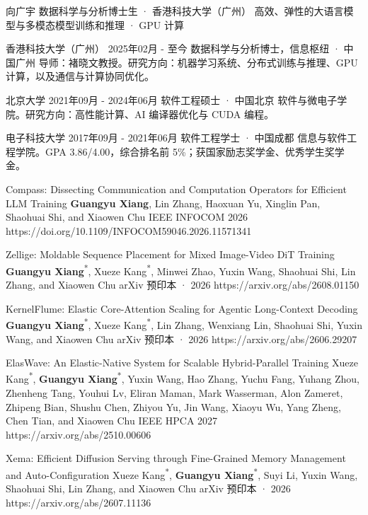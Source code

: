 \documentclass[10pt,a4paper]{article}
\begin{document}
\cvheader
  {向广宇}
  {数据科学与分析博士生 · 香港科技大学（广州）}
  {高效、弹性的大语言模型与多模态模型训练和推理 · GPU 计算}


\cventry
  {香港科技大学（广州）}
  {2025年02月 - 至今}
  {数据科学与分析博士，信息枢纽 · 中国广州}
  {导师：褚晓文教授。研究方向：机器学习系统、分布式训练与推理、GPU 计算，以及通信与计算协同优化。}

\cventry
  {北京大学}
  {2021年09月 - 2024年06月}
  {软件工程硕士 · 中国北京}
  {软件与微电子学院。研究方向：高性能计算、AI 编译器优化与 CUDA 编程。}

\cventry
  {电子科技大学}
  {2017年09月 - 2021年06月}
  {软件工程学士 · 中国成都}
  {信息与软件工程学院。GPA 3.86/4.00，综合排名前 5\%；获国家励志奖学金、优秀学生奖学金。}


\cvpublication
  {Compass: Dissecting Communication and Computation Operators for Efficient LLM Training}
  {\textbf{Guangyu Xiang}, Lin Zhang, Haoxuan Yu, Xinglin Pan, Shaohuai Shi, and Xiaowen Chu}
  {IEEE INFOCOM 2026}
  {https://doi.org/10.1109/INFOCOM59046.2026.11571341}

\cvpublication
  {Zellige: Moldable Sequence Placement for Mixed Image-Video DiT Training}
  {\textbf{Guangyu Xiang}\textsuperscript{*}, Xueze Kang\textsuperscript{*}, Minwei Zhao, Yuxin Wang, Shaohuai Shi, Lin Zhang, and Xiaowen Chu}
  {arXiv 预印本 · 2026}
  {https://arxiv.org/abs/2608.01150}

\cvpublication
  {KernelFlume: Elastic Core-Attention Scaling for Agentic Long-Context Decoding}
  {\textbf{Guangyu Xiang}\textsuperscript{*}, Xueze Kang\textsuperscript{*}, Lin Zhang, Wenxiang Lin, Shaohuai Shi, Yuxin Wang, and Xiaowen Chu}
  {arXiv 预印本 · 2026}
  {https://arxiv.org/abs/2606.29207}

\cvpublication
  {ElasWave: An Elastic-Native System for Scalable Hybrid-Parallel Training}
  {Xueze Kang\textsuperscript{*}, \textbf{Guangyu Xiang}\textsuperscript{*}, Yuxin Wang, Hao Zhang, Yuchu Fang, Yuhang Zhou, Zhenheng Tang, Youhui Lv, Eliran Maman, Mark Wasserman, Alon Zameret, Zhipeng Bian, Shushu Chen, Zhiyou Yu, Jin Wang, Xiaoyu Wu, Yang Zheng, Chen Tian, and Xiaowen Chu}
  {IEEE HPCA 2027}
  {https://arxiv.org/abs/2510.00606}

\cvpublication
  {Xema: Efficient Diffusion Serving through Fine-Grained Memory Management and Auto-Configuration}
  {Xueze Kang\textsuperscript{*}, \textbf{Guangyu Xiang}\textsuperscript{*}, Suyi Li, Yuxin Wang, Shaohuai Shi, Lin Zhang, and Xiaowen Chu}
  {arXiv 预印本 · 2026}
  {https://arxiv.org/abs/2607.11136}
\end{document}
